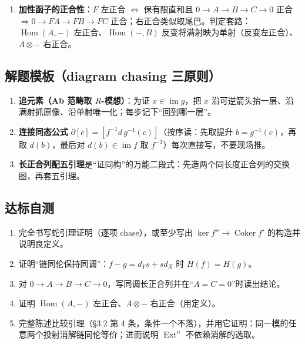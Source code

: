 \documentclass[12pt,a4paper]{ctexart}
\DeclareMathOperator{\Hom}{Hom}
\DeclareMathOperator{\Ext}{Ext}
\DeclareMathOperator{\Coker}{Coker}
\DeclareMathOperator{\im}{im}
\newcommand{\keypoint}{\text{\textbf{\ensuremath{\bigstar}}\;}}
\newcommand{\method}{\text{\textbf{方法}}\;}
\begin{document}
\begin{enumerate}
  \keypoint \textbf{两个直接推论}：① \textbf{消解的同伦唯一性}——对同一 $A$ 的任意两个投射消解取 $\alpha=\mathrm{id}_A$，得互为同伦逆的链映射，即链同伦等价（CE V \S1 在 (V.Prop 1.2) 后的推注）；② \textbf{导出函子良定义}——换消解时上述同伦等价经 $\Hom(-,B)$ 诱导\textbf{互逆同构}，故 $\Ext^n$ 与消解选取无关；且 $\alpha$ 的任意两个提升同伦、诱导映射相同，故 $\Ext^n(A,B)\to\Ext^n(A',B)$ 只依赖 $\alpha$ 本身（$R^nF$ 是\textbf{函子}）。这就是“消解的唯一性（同伦意义下）”与《派生函子良定义》的基础。
  \item \textbf{加性函子的正合性}：$F$ 左正合 $\iff$ 保有限直和且 $0\to A\to B\to C\to0$ 正合 $\Rightarrow0\to FA\to FB\to FC$ 正合；右正合类似取尾巴。\keypoint 判定套路：$\Hom(A,-)$ 左正合、$\Hom(-,B)$ 反变将满射映为单射（反变左正合）、$A\otimes-$ 右正合。
\end{enumerate}

\subsection{\method 解题模板（diagram chasing 三原则）}

\begin{enumerate}
  \item \textbf{追元素（Ab 范畴取 $R$-模想）}：为证 $x\in\im g$，把 $x$ 沿可逆箭头抬一层、沿满射抓原像、沿单射唯一化；每步记下“回到哪一层”。
  \item \textbf{连接同态公式} $\partial[c]=[f^{-1}d\,g^{-1}(c)]$（按序读：先取提升 $b=g^{-1}(c)$，再取 $d(b)$，最后对 $d(b)\in\im f$ 取 $f^{-1}$）每次直接写，不要现场推。
  \item \textbf{长正合列配五引理}是“证同构”的万能二段式：先造两个同长度正合列的交换图，再套五引理。
\end{enumerate}

\subsection{达标自测}
\begin{enumerate}[label=(\arabic*)]
  \item 完全书写蛇引理证明（逐项 chase），或至少写出 $\ker f''\to\Coker f'$ 的构造并说明良定义。
  \item 证明“链同伦保持同调”：$f-g=d_Ys+sd_X$ 时 $H(f)=H(g)$。
  \item 对 $0\to A\to B\to C\to0$，写同调长正合列并在“$A=C=0$”时读出结论。
  \item 证明 $\Hom(A,-)$ 左正合、$A\otimes-$ 右正合（用定义）。
  \item 完整陈述比较引理（\S3.2 第 4 条，条件一个不落），并用它证明：同一模的任意两个投射消解链同伦等价；进而说明 $\Ext^n$ 不依赖消解的选取。
\end{enumerate}
\end{document}
